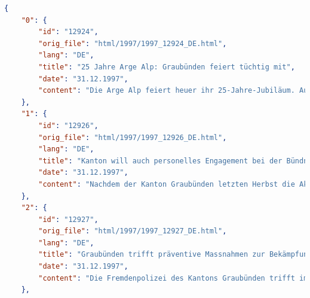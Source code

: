 \begin{lstlisting}[caption={Example for a JSON file containing the press releases extracted from the HTML files.}, captionpos=b, label=lst:json, language=json]
{
    "0": {
        "id": "12924",
        "orig_file": "html/1997/1997_12924_DE.html",
        "lang": "DE",
        "title": "25 Jahre Arge Alp: Graubünden feiert tüchtig mit",
        "date": "31.12.1997",
        "content": "Die Arge Alp feiert heuer ihr 25-Jahre-Jubiläum. Aus diesem Grund finden vom 27. September bis 12. Oktober 1997 die Festwochen des Alpenraums in Telfs-Mösern, Tirol, statt. ..."
    },
    "1": {
        "id": "12926",
        "orig_file": "html/1997/1997_12926_DE.html",
        "lang": "DE",
        "title": "Kanton will auch personelles Engagement bei der Bündner Kraftwerke AG verstärken",
        "date": "31.12.1997",
        "content": "Nachdem der Kanton Graubünden letzten Herbst die Aktienmehrheit der Bündner Kraftwerke AG übernommen hat, will er nun auch seine Vertretung im Verwaltungsrat stärken...."
    },
    "2": {
        "id": "12927",
        "orig_file": "html/1997/1997_12927_DE.html",
        "lang": "DE",
        "title": "Graubünden trifft präventive Massnahmen zur Bekämpfung der illegalen Einwanderung",
        "date": "31.12.1997",
        "content": "Die Fremdenpolizei des Kantons Graubünden trifft im Einvernehmen mit dem kantonalen Sozialamt, dem Amt für Zivilschutz sowie der Kantonspolizei Graubünden Massnahmen, um die illegale Einwanderung in den Südtälern des Kantons Graubünden zu bekämpfen...."
    },
\end{lstlisting}